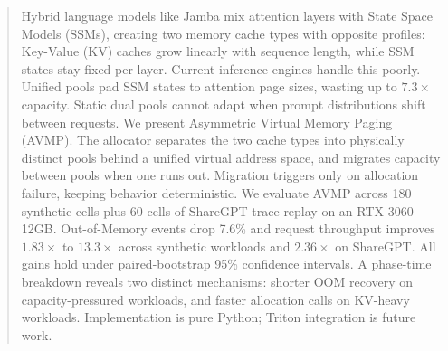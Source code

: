 
\begin{abstract}
Hybrid language models like Jamba mix attention layers with State Space Models (SSMs), creating two memory cache types with opposite profiles: Key-Value (KV) caches grow linearly with sequence length, while SSM states stay fixed per layer. Current inference engines handle this poorly. Unified pools pad SSM states to attention page sizes, wasting up to $7.3\times$ capacity. Static dual pools cannot adapt when prompt distributions shift between requests. We present Asymmetric Virtual Memory Paging (AVMP). The allocator separates the two cache types into physically distinct pools behind a unified virtual address space, and migrates capacity between pools when one runs out. Migration triggers only on allocation failure, keeping behavior deterministic. We evaluate AVMP across 180 synthetic cells plus 60 cells of ShareGPT trace replay on an RTX 3060 12GB. Out-of-Memory events drop 7.6\% and request throughput improves $1.83\times$ to $13.3\times$ across synthetic workloads and $2.36\times$ on ShareGPT. All gains hold under paired-bootstrap 95\% confidence intervals. A phase-time breakdown reveals two distinct mechanisms: shorter OOM recovery on capacity-pressured workloads, and faster allocation calls on KV-heavy workloads. Implementation is pure Python; Triton integration is future work.
\end{abstract}
